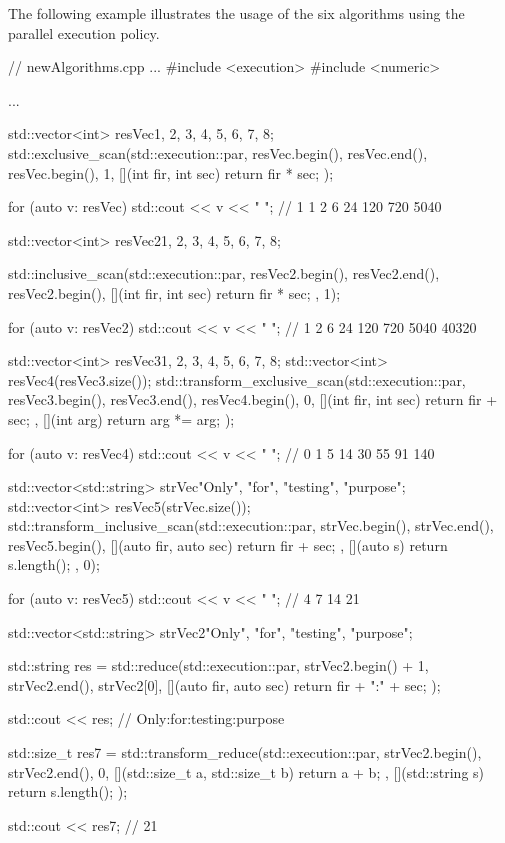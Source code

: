 The following example illustrates the usage of the six algorithms using the parallel execution policy.


\begin{cpp}
// newAlgorithms.cpp
...
#include <execution>
#include <numeric>

...

std::vector<int> resVec{1, 2, 3, 4, 5, 6, 7, 8};
std::exclusive_scan(std::execution::par,
					resVec.begin(), resVec.end(), resVec.begin(), 1,
					[](int fir, int sec){ return fir * sec; });

for (auto v: resVec) std::cout << v << " "; // 1 1 2 6 24 120 720 5040

std::vector<int> resVec2{1, 2, 3, 4, 5, 6, 7, 8};

std::inclusive_scan(std::execution::par,
					resVec2.begin(), resVec2.end(), resVec2.begin(),
					[](int fir, int sec){ return fir * sec; }, 1);

for (auto v: resVec2) std::cout << v << " "; // 1 2 6 24 120 720 5040 40320

std::vector<int> resVec3{1, 2, 3, 4, 5, 6, 7, 8};
std::vector<int> resVec4(resVec3.size());
std::transform_exclusive_scan(std::execution::par,
							  resVec3.begin(), resVec3.end(),
							  resVec4.begin(), 0,
							  [](int fir, int sec){ return fir + sec; },
							  [](int arg){ return arg *= arg; });

for (auto v: resVec4) std::cout << v << " "; // 0 1 5 14 30 55 91 140

std::vector<std::string> strVec{"Only", "for", "testing", "purpose"};
std::vector<int> resVec5(strVec.size());
std::transform_inclusive_scan(std::execution::par,
							  strVec.begin(), strVec.end(),
							  resVec5.begin(),
							  [](auto fir, auto sec){ return fir + sec; },
							  [](auto s){ return s.length(); }, 0);

for (auto v: resVec5) std::cout << v << " "; // 4 7 14 21

std::vector<std::string> strVec2{"Only", "for", "testing", "purpose"};

std::string res = std::reduce(std::execution::par,
						strVec2.begin() + 1, strVec2.end(), strVec2[0],
						[](auto fir, auto sec){ return fir + ":" + sec; });

std::cout << res; // Only:for:testing:purpose

std::size_t res7 = std::transform_reduce(std::execution::par,
						strVec2.begin(), strVec2.end(), 0,
						[](std::size_t a, std::size_t b){ return a + b; },
						[](std::string s){ return s.length(); });

std::cout << res7; // 21
\end{cpp}














